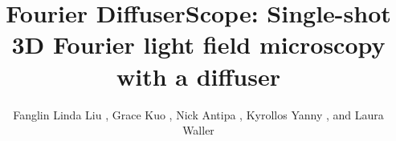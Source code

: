 \documentclass{osa-article}
\begin{document}
\title{Fourier DiffuserScope: Single-shot 3D Fourier light field microscopy with a diffuser}

\author{Fanglin Linda Liu , Grace Kuo , Nick Antipa , Kyrollos Yanny , and Laura Waller}

\address{ Electrical Engineering and Computer Sciences, University of California, Berkeley, 94709, USA\\}

\address{ UCB/UCSF Joint Graduate Program in Bioengineering, University of California, Berkeley, CA, 94709, USA \\}



\end{document}

